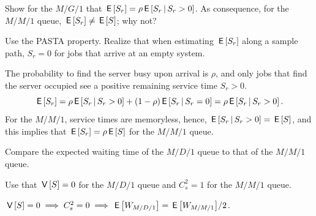 \documentclass[queueing-book.tex]{subfiles}
\begin{document}






\begin{exercise}\label{ex:5}
Show for the $M/G/1$ that $\,\mathsf{E}\left[S_r\right] = \rho \,\mathsf{E}\left[S_r\,\middle|\, S_r>0\right]$.  As consequence, for the $M/M/1$ queue, $\,\mathsf{E}\left[S_{r}\right] \neq \,\mathsf{E}\left[S\right]$; why not?
\begin{hint}
Use the PASTA property. Realize that when estimating $\,\mathsf{E}\left[S_r\right]$ along a sample path, $S_r=0$ for jobs that arrive at an empty system.
\end{hint}
\begin{solution}
 The probability to find the server busy upon arrival is $\rho$, and only jobs that find the server occupied see a positive remaining service time $S_r>0$.
\begin{equation*}
\,\mathsf{E}\left[S_r\right] = \rho \,\mathsf{E}\left[S_r\,\middle|\, S_r >0\right] + (1-\rho) \,\mathsf{E}\left[S_r\,\middle|\, S_r = 0\right] = \rho \,\mathsf{E}\left[S_r\,\middle|\, S_r>0\right].
\end{equation*}
For the $M/M/1$, service times are memoryless, hence, $\,\mathsf{E}\left[S_r \,\middle|\, S_r>0\right] = \,\mathsf{E}\left[S\right]$, and this implies that $\,\mathsf{E}\left[S_r\right] = \rho \,\mathsf{E}\left[S\right]$ for the $M/M/1$ queue.
\end{solution}
\end{exercise}



\begin{exercise}
Compare  the expected waiting time of the $M/D/1$ queue to that of the $M/M/1$ queue. %
\begin{hint}
Use that $\,\mathsf{V}\left[S\right]=0$ for the $M/D/1$ queue and $C_{s}^{2} = 1$ for the $M/M/1$ queue.
\end{hint}
\begin{solution}
$\,\mathsf{V}\left[S\right] = 0 \implies C_s^2 = 0 \implies \,\mathsf{E}\left[W_{M/D/1}\right] = {\,\mathsf{E}\left[W_{M/M/1}\right]}/2$.
\end{solution}
\end{exercise}
\end{document}
